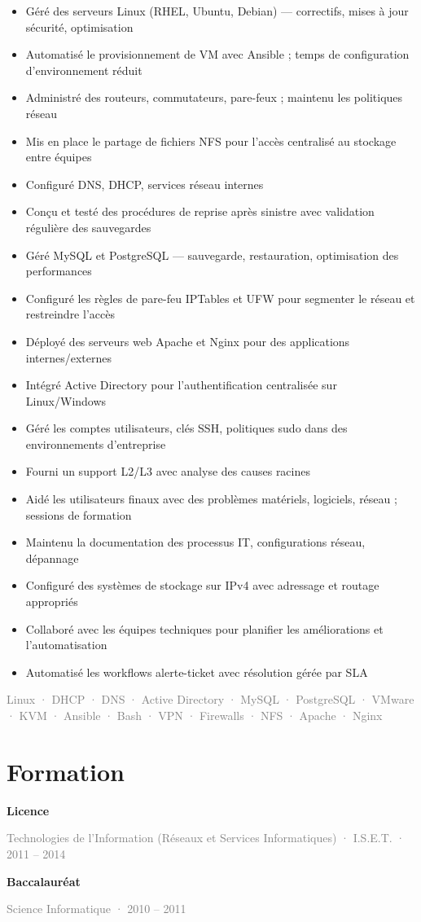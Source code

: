\documentclass[10pt,a4paper]{article}
\newcommand{\tagline}[1]{\textcolor{graytext}{\small #1}\par}
\begin{document}
\begin{itemize}
  \item Géré des serveurs Linux (RHEL, Ubuntu, Debian) — correctifs, mises à jour sécurité, optimisation
  \item Automatisé le provisionnement de VM avec Ansible ; temps de configuration d'environnement réduit
  \item Administré des routeurs, commutateurs, pare-feux ; maintenu les politiques réseau
  \item Mis en place le partage de fichiers NFS pour l'accès centralisé au stockage entre équipes
  \item Configuré DNS, DHCP, services réseau internes
  \item Conçu et testé des procédures de reprise après sinistre avec validation régulière des sauvegardes
  \item Géré MySQL et PostgreSQL — sauvegarde, restauration, optimisation des performances
  \item Configuré les règles de pare-feu IPTables et UFW pour segmenter le réseau et restreindre l'accès
  \item Déployé des serveurs web Apache et Nginx pour des applications internes/externes
  \item Intégré Active Directory pour l'authentification centralisée sur Linux/Windows
  \item Géré les comptes utilisateurs, clés SSH, politiques sudo dans des environnements d'entreprise
  \item Fourni un support L2/L3 avec analyse des causes racines
  \item Aidé les utilisateurs finaux avec des problèmes matériels, logiciels, réseau ; sessions de formation
  \item Maintenu la documentation des processus IT, configurations réseau, dépannage
  \item Configuré des systèmes de stockage sur IPv4 avec adressage et routage appropriés
  \item Collaboré avec les équipes techniques pour planifier les améliorations et l'automatisation
  \item Automatisé les workflows alerte-ticket avec résolution gérée par SLA
\end{itemize}
\tagline{Linux · DHCP · DNS · Active Directory · MySQL · PostgreSQL · VMware · KVM · Ansible · Bash · VPN · Firewalls · NFS · Apache · Nginx}
\vspace{1pt}
\section*{Formation}
\textbf{Licence}\par
\tagline{Technologies de l'Information (Réseaux et Services Informatiques) · I.S.E.T. · 2011 – 2014}
\textbf{Baccalauréat}\par
\tagline{Science Informatique · 2010 – 2011}
\end{document}
